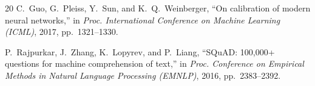 \documentclass[conference]{IEEEtran}
\begin{document}
\begin{thebibliography}{20}
C.~Guo, G.~Pleiss, Y.~Sun, and K.~Q.~Weinberger,
``On calibration of modern neural networks,''
in \textit{Proc. International Conference on Machine Learning (ICML)}, 2017, pp.~1321--1330.

P.~Rajpurkar, J.~Zhang, K.~Lopyrev, and P.~Liang,
``SQuAD: 100,000+ questions for machine comprehension of text,''
in \textit{Proc. Conference on Empirical Methods in Natural Language Processing (EMNLP)}, 2016, pp.~2383--2392.

\end{thebibliography}
\end{document}
